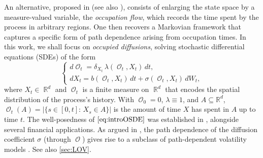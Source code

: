 \documentclass[11pt]{article}
\numberwithin{equation}{section}
\theoremstyle{plain}
\theoremstyle{definition}
\DeclareMathOperator{\R}{\mathbb{R}}
\DeclareMathOperator{\calO}{\mathcal{O}}
\begin{document}
An alternative, proposed in \cite{TissotOP,TissotThesis} (see also \cite{Bethencourt,SonerTissotZhang}), consists of enlarging the state  space by a 
measure-valued variable, the \textit{occupation flow},  which records the time spent by the process
in arbitrary regions. One then recovers a Markovian framework that captures a specific form of path dependence arising from  occupation times. 
 In this work, we shall focus on   
\emph{occupied diffusions}, solving stochastic differential equations (SDEs) of the form 
\begin{equation}\label{eq:introOSDE}
\begin{cases}
d\calO_t = \delta_{X_t}\,\lambda(\calO_t,X_t)\,dt,\\[0.3em]
dX_t = b(\calO_t,X_t)\,dt + \sigma(\calO_t,X_t)\,dW_t,
\end{cases}
\end{equation}
where $X_t\in \R^d$ and $\calO_t$ is a  finite measure on $\R^d$
that  encodes the spatial distribution of the process's history. With  $\calO_0=0$, $\lambda \equiv 1$, and $A \subseteq \mathbb R^d$, $\calO_t(A)=| \{s \in [0,t]: \, X_s \in A \}|$ is the amount of time $X$ has spent in $A$ up to time $t$. The well-posedness of $\eqref{eq:introOSDE}$ was established in \cite{TissotOP}, alongside several financial  applications. 
As argued in  \cite{TissotLOV}, the path dependence of the diffusion coefficient $\sigma$ (through $\calO$) gives rise to a  subclass of path-dependent volatility models \cite{GrasselliPages,Guyon2014,GuyonSlides,GuyonLekeufack}. See also \cref{sec:LOV}.
\end{document}
